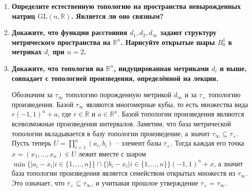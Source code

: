 \documentclass{article}
\begin{document}
\begin{enumerate}
    \item \textbf{Определите естественную топологию на пространства
        невырожденных матриц $\text{GL}(n,\mathbb{R})$. Является ли оно связным?}
        
    \item \textbf{Докажите, что функции расстояния $d_1,d_2,d_\infty$ задают
        структуру метрического пространства на $\mathbb{R}^n$. Нарисуйте открытые
        шары $B_0^1$ в метриках $d_i$ при $n=2$.}

    \item \textbf{Докажите, что топология на $\mathbb{R}^n$, индуцированная
        метриками $d_i$ и выше, совпадает с топологией произведения,
        определённой на лекции.}\par
        Обозначим за $\tau_\infty$ топологию порожденную метрикой $d_\infty$
        и за $\tau_\times$ топологию произведения. Базой $\tau_\infty$ являются
        многомерные кубы, то есть множества вида $r(-1,1)^n+a$, где $r\in
        \mathbb{R}$ и $a\in\mathbb{R}^n$. Базой топологии произведения
        являются всевозможные произведения интервалов. Заметим, что база
        метрической топологии вкладывается в базу топологии произведение, а
        значит $\tau_\infty\subseteq\tau_\times$. Пусть теперь $U=\prod_{i=1}^n
        (a_i,b_i)$ – элемент базы $\tau_\times$. Тогда каждая его точка $x=(x_1
        ,...,x_n)\in U$ лежит вместе с шаром $\min\{|a_i-x_i|i\in\{1,...,n\}\}
        \cap\{|b_i-x_i|i\in\{1,...,n\}\}(-1,1)^n+x$, а значит база топологии
        произведения является семейством открытых множеств из $\tau_\infty$.
        Это означает, что $\tau_\times\subseteq\tau_\infty$, и учитывая прошлое
        утверждение $\tau_\times=\tau_\infty$.\par


\end{enumerate}
\end{document}

